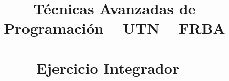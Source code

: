 \newcommand{\formalidadesTercerEnunciado}{
 \section{Objetivos y forma de entrega}
 
  El objetivo de esta entrega es construir un DSL utilizando el lenguaje Groovy para permitir la creación de reuniones según lo
  especificado en la siguiente sección. Es un requerimiento básico que el DSL generado interactúe con la solución desarrollada en Java
  en las entregas anteriores.
  Es importante también tratar de lograr que el DSL creado sea lo más expresivo posible considerando al menos los elementos del
  lenguaje vistos en clase.
  \smallskip
  
  Nos planteamos como objetivo resolver las correcciones del TP en el día para ello deberán coordinar con el tutor algún mecanismo
  para tener a mano el código y poder verlo en conjunto.


  \section{Nuevos requerimientos}
 
}

\title{Técnicas Avanzadas de Programación -- UTN -- FRBA\vspace{.2\baselineskip}
       \\ \cuatrimestre\
       \\ Ejercicio Integrador \
       \\ 
       \bigskip
      }
\date{}
\newcommand{\newest}[1]{#1} %
\newcommand{\oldest}[1]{}%

\newcommand{\flecha}{->}
\newcommand{\newconcept}[1]{\emph{#1}}

\DefineShortVerb{\|}

\author{}
	
